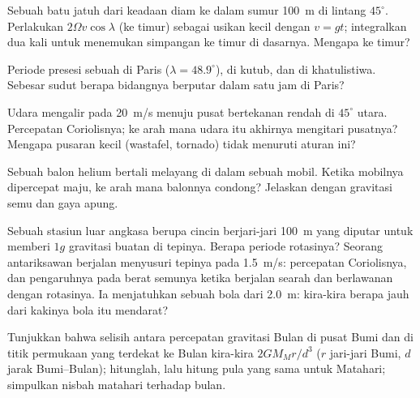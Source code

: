 \begin{exercise}[$\star\star$]\label{exo:b1:non-inertial-frames:7}
Sebuah batu jatuh dari keadaan diam ke dalam sumur \qty{100}{m} di lintang $45^\circ$.
Perlakukan  $2\Omega v\cos\lambda$ (ke timur) sebagai usikan
kecil dengan $v = gt$; integralkan dua kali untuk menemukan simpangan ke
timur di dasarnya. Mengapa ke timur?
\end{exercise}

\begin{exercise}[$\star\star$]\label{exo:b1:non-inertial-frames:8}
Periode presesi sebuah  di Paris ($\lambda = 48.9^\circ$),
di kutub, dan di khatulistiwa. Sebesar sudut berapa bidangnya berputar
dalam satu jam di Paris?
\end{exercise}

\begin{exercise}[$\star\star$]\label{exo:b1:non-inertial-frames:9}
Udara mengalir pada \qty{20}{m/s} menuju pusat bertekanan rendah di $45^\circ$
utara. Percepatan Coriolisnya; ke arah mana udara itu akhirnya
mengitari pusatnya? Mengapa pusaran kecil (wastafel, tornado) tidak menuruti
aturan ini?
\end{exercise}

\begin{exercise}[$\star\star\star$]\label{exo:b1:non-inertial-frames:10}
Sebuah balon helium bertali melayang di dalam sebuah mobil. Ketika mobilnya
dipercepat maju, ke arah mana balonnya condong? Jelaskan dengan
gravitasi semu dan gaya apung.
\end{exercise}

\begin{exercise}[$\star\star\star$]\label{exo:b1:non-inertial-frames:11}
Sebuah stasiun luar angkasa berupa cincin berjari-jari \qty{100}{m} yang diputar untuk memberi $1g$
gravitasi buatan di tepinya. Berapa periode rotasinya? Seorang antariksawan berjalan
menyusuri tepinya pada \qty{1.5}{m/s}: percepatan Coriolisnya, dan pengaruhnya pada
berat semunya ketika berjalan searah dan berlawanan dengan rotasinya. Ia menjatuhkan
sebuah bola dari \qty{2.0}{m}: kira-kira berapa jauh dari kakinya bola itu mendarat?
\end{exercise}

\begin{exercise}[$\star\star\star$]\label{exo:b1:non-inertial-frames:12}
Tunjukkan bahwa selisih antara percepatan gravitasi Bulan
di pusat Bumi dan di titik permukaan yang terdekat ke Bulan
kira-kira $2GM_Mr/d^3$ ($r$ jari-jari Bumi, $d$ jarak Bumi--Bulan);
hitunglah, lalu hitung pula yang sama untuk Matahari; simpulkan nisbah  matahari terhadap  bulan.
\end{exercise}

